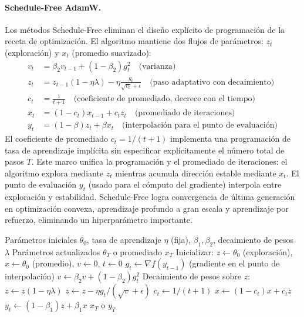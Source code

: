 \paragraph{Schedule-Free AdamW.}
Los métodos Schedule-Free eliminan el diseño explícito de programación de la receta de optimización. El algoritmo mantiene dos flujos de parámetros: $z_t$ (exploración) y $x_t$ (promedio suavizado):
\begin{align}
v_t &= \beta_2 v_{t-1} + (1-\beta_2)g_t^2 \quad\text{(varianza)} \\
z_t &= z_{t-1}(1-\eta\lambda) - \eta\frac{g_t}{\sqrt{v_t}+\epsilon} \quad\text{(paso adaptativo con decaimiento)} \\
c_t &= \frac{1}{t+1} \quad\text{(coeficiente de promediado, decrece con el tiempo)} \\
x_t &= (1-c_t)x_{t-1} + c_t z_t \quad\text{(promediado de iteraciones)} \\
y_t &= (1-\beta)z_t + \beta x_t \quad\text{(interpolación para el punto de evaluación)}
\end{align}
El coeficiente de promediado $c_t = 1/(t+1)$ implementa una programación de tasa de aprendizaje implícita sin especificar explícitamente el número total de pasos $T$. Este marco unifica la programación y el promediado de iteraciones: el algoritmo explora mediante $z_t$ mientras acumula dirección estable mediante $x_t$. El punto de evaluación $y_t$ (usado para el cómputo del gradiente) interpola entre exploración y estabilidad. Schedule-Free logra convergencia de última generación en optimización convexa, aprendizaje profundo a gran escala y aprendizaje por refuerzo, eliminando un hiperparámetro importante.

\begin{algorithm}[H]
\caption{Schedule-Free AdamW}
\label{alg:schedulefree}
\begin{algorithmic}[1]
\Require Parámetros iniciales $\theta_0$, tasa de aprendizaje $\eta$ (fija), $\beta_1, \beta_2$, decaimiento de pesos $\lambda$
\Ensure Parámetros actualizados $\theta_T$ o promediado $x_T$
\State Inicializar: $z \gets \theta_0$ (exploración), $x \gets \theta_0$ (promedio), $v \gets 0$, $t \gets 0$
    \State $g_t \gets \nabla f(y_{t-1})$ (gradiente en el punto de interpolación)
    \State $v \gets \beta_2 v + (1-\beta_2) g_t^2$ 
    \State Decaimiento de pesos sobre $z$: $z \gets z(1 - \eta\lambda)$
    \State $z \gets z - \eta g_t / (\sqrt{v} + \epsilon)$ 
    \State $c_t \gets 1 / (t+1)$ 
    \State $x \gets (1-c_t) x + c_t z$ 
    \State $y_t \gets (1-\beta_1) z + \beta_1 x$ 
\EndFor
\Return $x_T$ o $y_T$
\end{algorithmic}
\end{algorithm}

